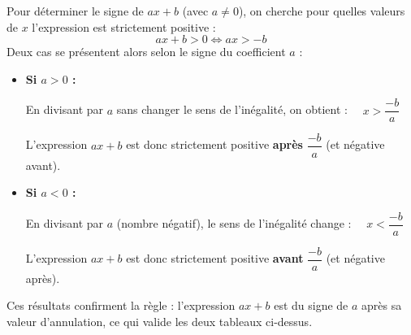 \begin{demo}
	Pour déterminer le signe de $ax + b$ (avec $a \neq 0$), on cherche pour quelles valeurs de $x$ l'expression est strictement positive :
	\[
		ax + b > 0 \iff ax > -b
	\]
	Deux cas se présentent alors selon le signe du coefficient $a$ :

	\begin{itemize}
		\item \textbf{Si $a > 0$ :}

		      En divisant par $a$ sans changer le sens de l'inégalité, on obtient : $\quad x > \dfrac{-b}{a}$

		      L'expression $ax + b$ est donc strictement positive \textbf{après} $\dfrac{-b}{a}$ (et négative avant).

		\item \textbf{Si $a < 0$ :}

		      En divisant par $a$ (nombre négatif), le sens de l'inégalité change : $\quad x < \dfrac{-b}{a}$

		      L'expression $ax + b$ est donc strictement positive \textbf{avant} $\dfrac{-b}{a}$ (et négative après).
	\end{itemize}

	Ces résultats confirment la règle : l'expression $ax + b$ est du signe de $a$ après sa valeur d'annulation, ce qui valide les deux tableaux ci-dessus.
\end{demo}

\newpage

